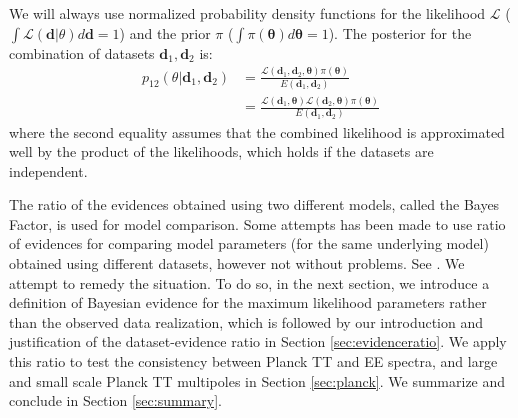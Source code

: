 \documentclass[amsmath, prd, reprint, aps]{revtex4-1}
\newcommand{\dv}{\textbf{d}}
\newcommand{\tv}{\bm{\theta}}
\begin{document}
We will always use normalized probability density functions for the likelihood $\mathcal{L}$ ($\int \mathcal{L}(\dv|\theta) d\dv = 1$) and the prior $\pi$ ($\int \pi(\tv) d \tv =1$). The posterior for the combination of datasets $\dv_1, \dv_2$ is:
\begin{align}
    p_{12}(\theta|\dv_1,\dv_2) &= \frac{\mathcal{L}(\dv_1, \dv_2, \tv) \pi(\tv)}{E(\dv_1, \dv_2)} \\ &= \frac{\mathcal{L}(\dv_1, \tv) \mathcal{L}(\dv_2, \tv) \pi(\tv)}{E(\dv_1, \dv_2)}
\end{align}
where the second equality assumes that the combined likelihood is approximated well by the product of the likelihoods, which holds if the datasets are independent.

The ratio of the evidences obtained using two different models, called the Bayes Factor, is used for model comparison. Some attempts has been made to use ratio of evidences for comparing model parameters (for the same underlying model) obtained using different datasets, however not without problems. See \cite{Marshall:2004zd, Grandis:2016fwl}. We attempt to remedy the situation. To do so, in the next section, we introduce a definition of Bayesian evidence for the maximum likelihood parameters rather than the observed data realization, which is followed by our introduction and justification of the dataset-evidence ratio in Section \ref{sec:evidenceratio}. We apply this ratio to test the consistency between Planck TT and EE spectra, and large and small scale Planck TT multipoles in Section \ref{sec:planck}. We summarize and conclude in Section \ref{sec:summary}.
\end{document}
